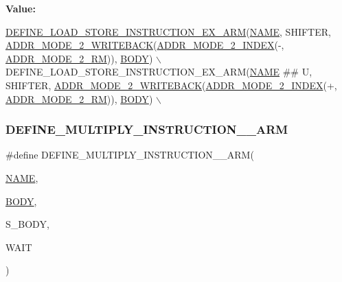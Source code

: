 {\bfseries Value\+:}
\begin{DoxyCode}
\mbox{\hyperlink{isa-arm_8c_af3fcd6969f12879634732491de99e437}{DEFINE\_LOAD\_STORE\_INSTRUCTION\_EX\_ARM}}(\mbox{\hyperlink{inflate_8h_a164ea0159d5f0b5f12a646f25f99eceaa67bc2ced260a8e43805d2480a785d312}{NAME}}, SHIFTER, 
      \mbox{\hyperlink{isa-arm_8c_a6cbeb951edc491533b2b648bb318961b}{ADDR\_MODE\_2\_WRITEBACK}}(\mbox{\hyperlink{isa-arm_8c_a2521ae1da803e2179985f57ede8ad83f}{ADDR\_MODE\_2\_INDEX}}(-, 
      \mbox{\hyperlink{isa-arm_8c_a39cc73f0f2527ccf0188efba566c04cf}{ADDR\_MODE\_2\_RM}})), \mbox{\hyperlink{gzlog_8c_aa6bdf6a6d9916c343e1e17774d84a156}{BODY}}) \(\backslash\)
    DEFINE\_LOAD\_STORE\_INSTRUCTION\_EX\_ARM(\mbox{\hyperlink{inflate_8h_a164ea0159d5f0b5f12a646f25f99eceaa67bc2ced260a8e43805d2480a785d312}{NAME}} ## U, SHIFTER, 
      \mbox{\hyperlink{isa-arm_8c_a6cbeb951edc491533b2b648bb318961b}{ADDR\_MODE\_2\_WRITEBACK}}(\mbox{\hyperlink{isa-arm_8c_a2521ae1da803e2179985f57ede8ad83f}{ADDR\_MODE\_2\_INDEX}}(+, 
      \mbox{\hyperlink{isa-arm_8c_a39cc73f0f2527ccf0188efba566c04cf}{ADDR\_MODE\_2\_RM}})), \mbox{\hyperlink{gzlog_8c_aa6bdf6a6d9916c343e1e17774d84a156}{BODY}}) \(\backslash\)
\end{DoxyCode}
\mbox{\label{isa-arm_8c_a84bf848ce5a38235e0b670ee30fc85a7}} 
\subsubsection{\texorpdfstring{D\+E\+F\+I\+N\+E\+\_\+\+M\+U\+L\+T\+I\+P\+L\+Y\+\_\+\+I\+N\+S\+T\+R\+U\+C\+T\+I\+O\+N\+\_\+\_\+\+A\+RM}{DEFINE\_MULTIPLY\_INSTRUCTION\_2\_ARM}}
{\footnotesize\ttfamily \#define D\+E\+F\+I\+N\+E\+\_\+\+M\+U\+L\+T\+I\+P\+L\+Y\+\_\+\+I\+N\+S\+T\+R\+U\+C\+T\+I\+O\+N\+\_\+\_\+\+A\+RM(\begin{DoxyParamCaption}\item[{}]{\mbox{\hyperlink{inflate_8h_a164ea0159d5f0b5f12a646f25f99eceaa67bc2ced260a8e43805d2480a785d312}{N\+A\+ME}},  }\item[{}]{\mbox{\hyperlink{gzlog_8c_aa6bdf6a6d9916c343e1e17774d84a156}{B\+O\+DY}},  }\item[{}]{S\+\_\+\+B\+O\+DY,  }\item[{}]{W\+A\+IT }\end{DoxyParamCaption})}

